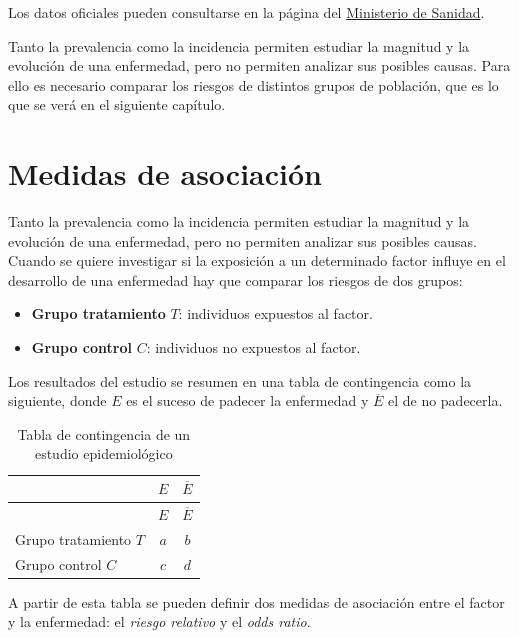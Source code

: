 \documentclass[
  spanish,
  a4paper,
]{scrreport}
\providecommand{\tightlist}{%
  \setlength{\itemsep}{0pt}\setlength{\parskip}{0pt}}
\theoremstyle{definition}
\theoremstyle{definition}
\theoremstyle{remark}
\begin{document}
Los datos oficiales pueden consultarse en la página del
\href{https://www.sanidad.gob.es/profesionales/saludPublica/ccayes/alertasActual/nCov/situacionActual.htm}{Ministerio
de Sanidad}.

Tanto la prevalencia como la incidencia permiten estudiar la magnitud y
la evolución de una enfermedad, pero no permiten analizar sus posibles
causas. Para ello es necesario comparar los riesgos de distintos grupos
de población, que es lo que se verá en el siguiente capítulo.


\chapter{Medidas de asociación}\label{sec-medidas-asociacion}

Tanto la prevalencia como la incidencia permiten estudiar la magnitud y
la evolución de una enfermedad, pero no permiten analizar sus posibles
causas. Cuando se quiere investigar si la exposición a un determinado
factor influye en el desarrollo de una enfermedad hay que comparar los
riesgos de dos grupos:

\begin{itemize}
\tightlist
\item
  \textbf{Grupo tratamiento} \(T\): individuos expuestos al factor.
\item
  \textbf{Grupo control} \(C\): individuos no expuestos al factor.
\end{itemize}

Los resultados del estudio se resumen en una tabla de contingencia como
la siguiente, donde \(E\) es el suceso de padecer la enfermedad y
\(\overline E\) el de no padecerla.

\begin{longtable}[]{@{}lcc@{}}
\caption{Tabla de contingencia de un estudio
epidemiológico}\label{tbl-contingencia}\tabularnewline
\toprule\noalign{}
& \(E\) & \(\overline{E}\) \\
\midrule\noalign{}
\endfirsthead
\toprule\noalign{}
& \(E\) & \(\overline{E}\) \\
\midrule\noalign{}
\endhead
\bottomrule\noalign{}
\endlastfoot
Grupo tratamiento \(T\) & \(a\) & \(b\) \\
Grupo control \(C\) & \(c\) & \(d\) \\
\end{longtable}

A partir de esta tabla se pueden definir dos medidas de asociación entre
el factor y la enfermedad: el \emph{riesgo relativo} y el \emph{odds
ratio}.
\end{document}

